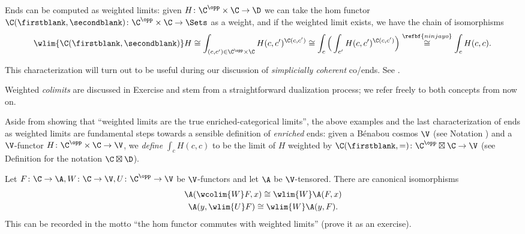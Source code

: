 \begin{example}\label{ends-are-weighted}
Ends can be computed as weighted limits: given $H\colon \C^\opp\times\C\to\D$ we can take the hom functor $\C(\firstblank,\secondblank)\colon \C^\opp\times\C\to\Sets$ as a weight, and if the weighted limit exists, we have the chain of isomorphisms
\[
\wlim{\C(\firstblank,\secondblank)}H\cong \int_{(c,c')\in \C^\opp\times\C } H(c,c')^{\C(c,c')}\cong 
\int_c \Big( \int_{c'}H(c,c')^{\C(c,c')}\Big)\stackrel{\refbf{ninjayo}}{\cong}\int_c H(c,c).
\]
\end{example}
\begin{remark}
This characterization will turn out to be useful during our discussion of \emph{simplicially coherent} co/ends. See .
\end{remark}
\begin{remark}
Weighted \emph{colimits} are discussed in Exercise  and stem from a straightforward dualization process; we refer freely to both concepts from now on.
\end{remark}
\begin{remark}
Aside from showing that ``weighted limits are the true enriched-categorical limits'', the above examples and the last characterization of ends as weighted limits are fundamental steps towards a sensible definition of \emph{enriched} ends: given a B\'enabou cosmos $\V$ (see Notation ) and a $\V$-functor $H\colon \C^\opp\times\C\to\V$, we \emph{define} $\int_c H(c,c)$ to be the limit of $H$ weighted by $\C(\firstblank,=)\colon \C^\opp\boxtimes\C\to\V$ (see Definition  for the notation $\C\boxtimes \D$).
\end{remark}
\begin{remark}\label{homcommuteswei}
Let $F\colon \C \to \A, W\colon \C \to \V, U\colon \C^\opp\to \V$ be $\V$-functors and let $\A$ be $\V$-tensored. There are canonical isomorphisms
\begin{gather}
\A(\wcolim{W}F,x)\cong \wlim{W}\A(F,x)\\
\A(y, \wlim{U}F)\cong \wlim{W}\A(y, F).
\end{gather}
This can be recorded in the motto ``the hom functor commutes with weighted limits'' (prove it as an exercise).
\end{remark}
